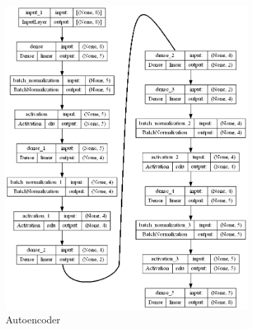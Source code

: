 \documentclass[a4paper,12pt]{report}
\theoremstyle{definitionNODot}
\begin{document}
	\begin{figure}[H]
		\begin{subfigure}[b]{0.3\textwidth}
			\centering
			\includegraphics[width=\textwidth]{plot_model_autoencoder_model_c.png}
			\caption{Autoencoder}
			\label{fig:plot_model_autoencoder_model}
		\end{subfigure}
		\hfill
		\begin{subfigure}[b]{0.3\textwidth}
			\centering

\end{subfigure}
\end{figure}
\end{document}

